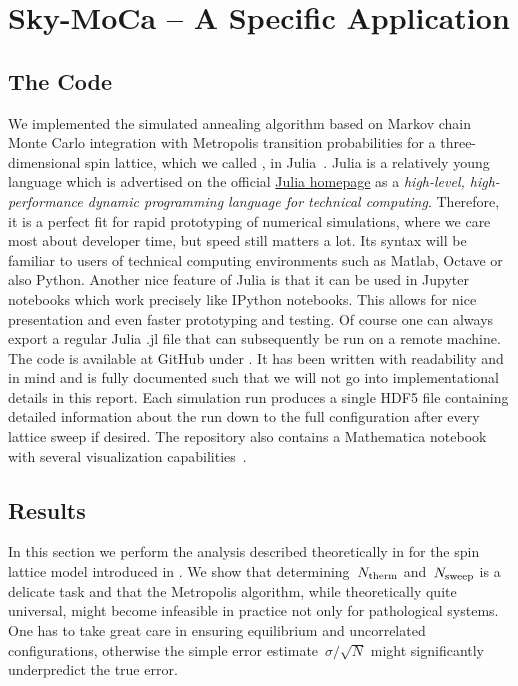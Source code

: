 %
\chapter{Sky-MoCa -- A Specific Application}\label{chap:2}
%
\section{The Code}\label{sec:code}
%
We implemented the simulated annealing algorithm based on Markov chain Monte
Carlo integration with Metropolis transition probabilities for a
three-dimensional spin lattice, which we called , in
Julia~\cite{julia}. Julia is a relatively young language which is advertised on
the official \href{http://julialang.org/}{Julia homepage} as a \emph{high-level,
high-performance dynamic programming language for technical computing}.
Therefore, it is a perfect fit for rapid prototyping of numerical simulations,
where we care most about developer time, but speed still matters a lot. Its
syntax will be familiar to users of technical computing environments such as
Matlab, Octave or also Python. Another nice feature of Julia is that it can be
used in Jupyter notebooks which work precisely like IPython notebooks. This
allows for nice presentation and even faster prototyping and testing. Of course
one can always export a regular Julia \textsf{.jl} file that can subsequently be
run on a remote machine. The code is available at GitHub under
\todo{}. It has been written with readability and in mind and is fully
documented such that we will not go into implementational details in this
report. Each simulation run produces a single HDF5 file containing detailed
information about the run down to the full configuration after every lattice
sweep if desired. The repository also contains a Mathematica notebook with
several visualization capabilities~\cite{mathematica}.
%
\section{Results}\label{sec:results}
%
In this section we perform the analysis described theoretically in
 for the spin lattice model introduced in
. We show that determining~$N_{\mathrm{therm}}$ and~$N_{\mathrm{sweep}}$ is a
delicate task and that the Metropolis algorithm, while theoretically quite
universal, might become infeasible in practice not only for pathological
systems. One has to take great care in ensuring equilibrium and uncorrelated
configurations, otherwise the simple error estimate~$\sigma/\sqrt{N}$ might
significantly underpredict the true error.


